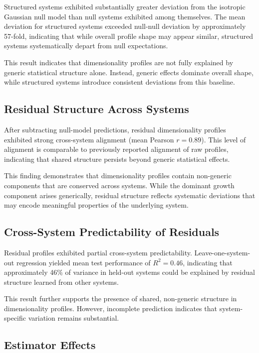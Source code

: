Structured systems exhibited substantially greater deviation from the isotropic Gaussian null model than null systems exhibited among themselves. The mean deviation for structured systems exceeded null-null deviation by approximately 57-fold, indicating that while overall profile shape may appear similar, structured systems systematically depart from null expectations.

This result indicates that dimensionality profiles are not fully explained by generic statistical structure alone. Instead, generic effects dominate overall shape, while structured systems introduce consistent deviations from this baseline.

\subsection{Residual Structure Across Systems}

After subtracting null-model predictions, residual dimensionality profiles exhibited strong cross-system alignment (mean Pearson $r = 0.89$). This level of alignment is comparable to previously reported alignment of raw profiles, indicating that shared structure persists beyond generic statistical effects.

This finding demonstrates that dimensionality profiles contain non-generic components that are conserved across systems. While the dominant growth component arises generically, residual structure reflects systematic deviations that may encode meaningful properties of the underlying system.

\subsection{Cross-System Predictability of Residuals}

Residual profiles exhibited partial cross-system predictability. Leave-one-system-out regression yielded mean test performance of $R^2 = 0.46$, indicating that approximately 46\% of variance in held-out systems could be explained by residual structure learned from other systems.

This result further supports the presence of shared, non-generic structure in dimensionality profiles. However, incomplete prediction indicates that system-specific variation remains substantial.

\subsection{Estimator Effects}

